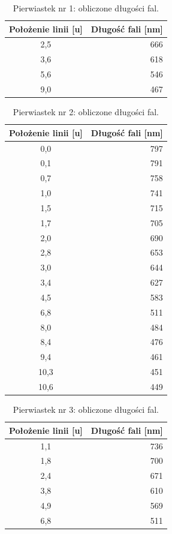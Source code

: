 \documentclass[a4paper,12pt]{article}
\begin{document}
\begin{table}[H]
    \centering
    \begin{tabular}{|c|r|}
        \hline
        Położenie linii [u] & Długość fali [nm] \\ \hline
        2{,}5 & 666 \\ \hline
        3{,}6 & 618 \\ \hline
        5{,}6 & 546 \\ \hline
        9{,}0 & 467 \\ \hline
    \end{tabular}
    \caption{Pierwiastek nr 1: obliczone długości fal.}
    \label{tab:unknown1}
\end{table}

\begin{table}[H]
    \centering
    \begin{tabular}{|c|r|}
        \hline
        Położenie linii [u] & Długość fali [nm] \\ \hline
        0{,}0 & 797 \\ \hline
        0{,}1 & 791 \\ \hline
        0{,}7 & 758 \\ \hline
        1{,}0 & 741 \\ \hline
        1{,}5 & 715 \\ \hline
        1{,}7 & 705 \\ \hline
        2{,}0 & 690 \\ \hline
        2{,}8 & 653 \\ \hline
        3{,}0 & 644 \\ \hline
        3{,}4 & 627 \\ \hline
        4{,}5 & 583 \\ \hline
        6{,}8 & 511 \\ \hline
        8{,}0 & 484 \\ \hline
        8{,}4 & 476 \\ \hline
        9{,}4 & 461 \\ \hline
        10{,}3 & 451 \\ \hline
        10{,}6 & 449 \\ \hline
    \end{tabular}
    \caption{Pierwiastek nr 2: obliczone długości fal.}
    \label{tab:unknown2}
\end{table}

\begin{table}[H]
    \centering
    \begin{tabular}{|c|r|}
        \hline
        Położenie linii [u] & Długość fali [nm] \\ \hline
        1{,}1 & 736 \\ \hline
        1{,}8 & 700 \\ \hline
        2{,}4 & 671 \\ \hline
        3{,}8 & 610 \\ \hline
        4{,}9 & 569 \\ \hline
        6{,}8 & 511 \\ \hline
    \end{tabular}
    \caption{Pierwiastek nr 3: obliczone długości fal.}
    \label{tab:unknown3}
\end{table}
\end{document}
